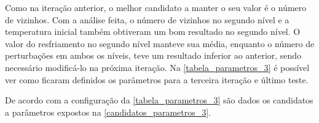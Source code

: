 \documentclass[
	12pt,				%
	twoside,			%
	a4paper,			%
	english,			%
	french,				%
	spanish,			%
	brazil				%
	]{abntex2}
\begin{document}
Como na iteração anterior, o melhor candidato a manter o seu valor é o
número de vizinhos. Com a análise feita, o número de vizinhos no segundo
nível e a temperatura inicial também obtiveram um bom resultado no
segundo nível. O valor do resfriamento no segundo nível manteve sua
média, enquanto o número de perturbações em ambos os níveis, teve um
resultado inferior ao anterior, sendo necessário modificá-lo na próxima
iteração. Na \autoref{tabela_parametros_3} é possível ver como ficaram
definidos os parâmetros para a terceira iteração e último teste.

\begin{table}[ht]
    \centering
    \caption{Fatores para parâmetro para o \textit{Simulated Annealing} na terceira iteração.}
    \label{tabela_parametros_3}
\end{table}

De acordo com a configuração da \autoref{tabela_parametros_3} são dados
os candidatos a parâmetros expostos na
\autoref{candidatos_parametros_3}.
\end{document}
